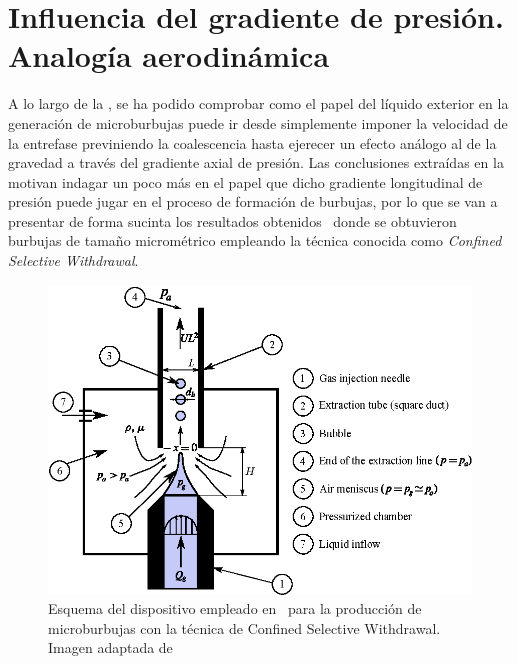 \section{Influencia del gradiente de presión. Analogía aerodinámica}

A lo largo de la , se ha podido comprobar como el papel del líquido exterior en la generación de microburbujas puede ir desde simplemente imponer la velocidad de la entrefase previniendo la coalescencia hasta ejerecer un efecto análogo al de la gravedad a través del gradiente axial de presión. Las conclusiones extraídas en la  motivan indagar un poco más en el papel que dicho gradiente longitudinal de presión puede jugar en el proceso de formación de burbujas, por lo que se van a presentar de forma sucinta los resultados obtenidos~\cite{Evangelio2015b} donde se obtuvieron burbujas de tamaño micrométrico empleando la técnica conocida como \emph{Confined Selective Withdrawal}.

\begin{figure}[hbtp!]
\includegraphics[scale=1]{introduccion/figuras/esquemaCSW.eps}
\caption{Esquema del dispositivo empleado en~\cite{Evangelio2015b} para la producción de microburbujas con la técnica de Confined Selective Withdrawal. Imagen adaptada de~\cite{Evangelio2015b}}
\end{figure}

